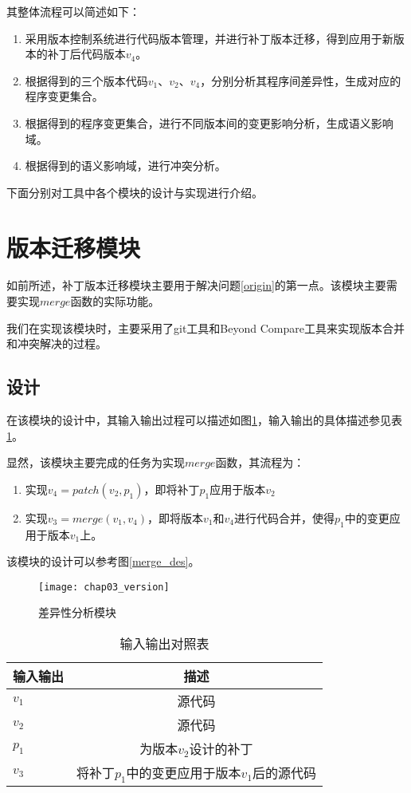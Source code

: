 其整体流程可以简述如下：

\begin{enumerate}
	\item 采用版本控制系统进行代码版本管理，并进行补丁版本迁移，得到应用于新版本的补丁后代码版本$v_4$。
	\item 根据得到的三个版本代码$v_1$、$v_2$、$v_4$，分别分析其程序间差异性，生成对应的程序变更集合。
	\item 根据得到的程序变更集合，进行不同版本间的变更影响分析，生成语义影响域。
	\item 根据得到的语义影响域，进行冲突分析。
\end{enumerate}

下面分别对工具中各个模块的设计与实现进行介绍。

\section{版本迁移模块}
\label {tool_patch}

如前所述，补丁版本迁移模块主要用于解决问题\ref {origin}的第一点。该模块主要需要实现$merge$函数的实际功能。

我们在实现该模块时，主要采用了git工具和Beyond Compare工具来实现版本合并和冲突解决的过程。

\subsection{设计}

在该模块的设计中，其输入输出过程可以描述如图\ref {version}，输入输出的具体描述参见表\ref {version_io}。

显然，该模块主要完成的任务为实现$merge$函数，其流程为：
\begin{enumerate}
	\item 实现$v_4 = patch(v_2,p_1)$，即将补丁$p_1$应用于版本$v_2$
	\item 实现$v_3 = merge(v_1,v_4)$，即将版本$v_1$和$v_4$进行代码合并，使得$p_1$中的变更应用于版本$v_1$上。
\end{enumerate}

该模块的设计可以参考图\ref {merge_des}。

\begin{figure}[H]
	\centering
	\texttt{[image: chap03\_version]}
	\caption {差异性分析模块}
	\label {version}	
\end{figure}

\begin{table}[H]
	\caption{输入输出对照表}
	\label{version_io}
	\centering
	\begin{tabular}{lc}
		\toprule[1.5pt]
		{\heiti 输入输出} & {\heiti 描述}\\\midrule[1pt]
		$v_1$ & 源代码 \\
		$v_2$ & 源代码 \\
		$p_1$ & 为版本$v_2$设计的补丁 \\
		$v_3$ & 将补丁$p_1$中的变更应用于版本$v_1$后的源代码 \\
		\bottomrule[1.5pt]
	\end{tabular}
\end{table}

